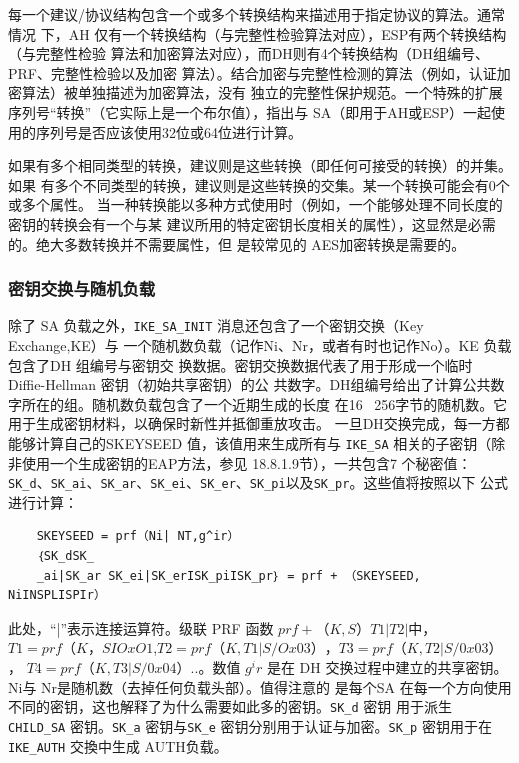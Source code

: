 每一个建议/协议结构包含一个或多个转换结构来描述用于指定协议的算法。通常情况
下，AH 仅有一个转换结构（与完整性检验算法对应），ESP有两个转换结构（与完整性检验
算法和加密算法对应），而DH则有4个转换结构（DH组编号、PRF、完整性检验以及加密
算法）。结合加密与完整性检测的算法（例如，认证加密算法）被单独描述为加密算法，没有
独立的完整性保护规范。一个特殊的扩展序列号“转换”（它实际上是一个布尔值），指出与
SA（即用于AH或ESP）一起使用的序列号是否应该使用32位或64位进行计算。

如果有多个相同类型的转换，建议则是这些转换（即任何可接受的转换）的并集。如果
有多个不同类型的转换，建议则是这些转换的交集。某一个转换可能会有0个或多个属性。
当一种转换能以多种方式使用时（例如，一个能够处理不同长度的密钥的转换会有一个与某
建议所用的特定密钥长度相关的属性），这显然是必需的。绝大多数转换并不需要属性，但
是较常见的 AES加密转换是需要的。

\subsubsection{密钥交换与随机负载}

除了 SA 负载之外，\verb|IKE_SA_INIT| 消息还包含了一个密钥交换（Key Exchange,KE）与
一个随机数负载（记作Ni、Nr，或者有时也记作No）。KE 负载包含了DH 组编号与密钥交
换数据。密钥交换数据代表了用于形成一个临时 Diffie-Hellman 密钥（初始共享密钥）的公
共数字。DH组编号给出了计算公共数字所在的组。随机数负载包含了一个近期生成的长度
在16 ~256字节的随机数。它用于生成密钥材料，以确保时新性并抵御重放攻击。
一旦DH交换完成，每一方都能够计算自己的SKEYSEED 值，该值用来生成所有与
\verb|IKE_SA| 相关的子密钥（除非使用一个生成密钥的EAP方法，参见 18.8.1.9节），一共包含7
个秘密值：\verb|SK_d|、\verb|SK_ai|、\verb|SK_ar|、\verb|SK_ei|、\verb|SK_er|、\verb|SK_pi|以及\verb|SK_pr|。这些值将按照以下
公式进行计算：

\begin{verbatim}
    SKEYSEED = prf（Ni| NT,g^ir）
    ｛SK_dSK_
    _ai|SK_ar SK_ei|SK_erISK_piISK_pr｝ = prf + （SKEYSEED, NiINSPLISPIr）
\end{verbatim}

此处，“|”表示连接运算符。级联 PRF 函数 $prf+ （K, S）T1 | T2|$中，$T1 = prf（K，
SIOxO1$,$T2 = prf（K, T1|S/Ox03）$，$T3 = prf（K, T2|S/0x03）$， $T4 = prf（K, T3|S/0x04）..。$数值 $g^ir$
是在 DH 交换过程中建立的共享密钥。Ni与 Nr是随机数（去掉任何负载头部）。值得注意的
是每个SA 在每一个方向使用不同的密钥，这也解释了为什么需要如此多的密钥。\verb|SK_d| 密钥
用于派生 \verb|CHILD_SA| 密钥。\verb|SK_a| 密钥与\verb|SK_e| 密钥分别用于认证与加密。\verb|SK_p| 密钥用于在
\verb|IKE_AUTH| 交換中生成 AUTH负载。

